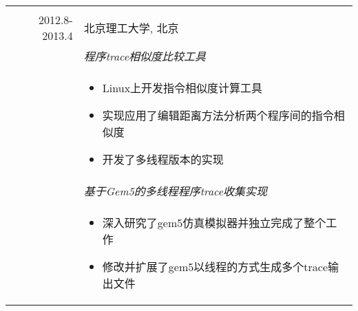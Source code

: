 \documentclass[a4paper,10pt]{article} %
\begin{document}
\begin{tabular}{r|p{11cm}}
\multicolumn{2}{c}{} \\
\textsc{2012.8-2013.4} &  \textsc{北京理工大学}, 北京 \smallskip\\
& \emph{程序trace相似度比较工具}\\ 
& \footnotesize{
\begin{itemize}
\item Linux上开发指令相似度计算工具
\item 实现应用了编辑距离方法分析两个程序间的指令相似度
\item 开发了多线程版本的实现
\end{itemize}
}\smallskip\\
& \emph{基于Gem5的多线程程序trace收集实现}\smallskip\\
& \footnotesize{
\begin{itemize}
\item 深入研究了gem5仿真模拟器并独立完成了整个工作
\item 修改并扩展了gem5以线程的方式生成多个trace输出文件
\end{itemize}
}\smallskip\\

\end{tabular}
\pagebreak
\end{document}
